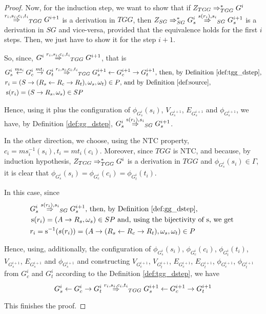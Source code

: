 \begin{proof}
	Now, for the induction step, we want to show that if $Z_{TGG} \Rightarrow^*_{TGG} G^i$ $\tderiv{r_{i}}{s_{i},c_{i},t_{i}}{TGG} G^{i+1}$ is a derivation in $TGG$, then $\startG{SG} \derivtr{SG} G^i_s \deriv{s(r_{i})}{s_{i}}{SG} G^{i+1}_s$ is a derivation in $SG$ and vice-versa, provided that the equivalence holds for the first $i$ steps. Then, we just have to show it for the step $i+1$.
	
	So, since, $G^i \tderiv{r_{i}}{s_{i},c_{i},t_{i}}{TGG} G^{i+1}$, that is
	\begin{align*}
		& G^i_s \ms{ms_i} G^i_c \mt{mt_i} G^i_t \tderiv{r_i}{s_i,c_i,t_i}{TGG} G^{i+1}_s \ms{} G^{i+1}_c \mt{} G^{i+1}_t \text{, then, by Definition \ref{def:tgg_dstep},}\\
		& r_i = (S \pro (R_s \ms{} R_c \mt{} R_t), \omega_s, \omega_t) \in P \text{, and by Definition \ref{def:source},}\\
		& \source(r_i) = (S \pro R_s, \omega_s) \in SP
	\end{align*}
	
	Hence, using it plus the configuration of $\phi_{G^i_s}(s_i)$, $V_{G^{i+1}_s}$, $E_{G^{i+1}_s}$ and $\phi_{G^{i+1}_s}$, we have, by Definition \ref{def:gg_dstep}, $G_s^i \deriv{\source(r_i)}{s_i}{SG} G^{i+1}_s$.
	
	In the other direction, we choose, using the NTC property, $c_i = ms_i^{-1}(s_i), t_i = mt_i(c_i)$. Moreover, since $TGG$ is NTC, and because, by induction hypothesis, $Z_{TGG} \Rightarrow^*_{TGG} G^i$ is a derivation in $TGG$ and $\phi_{G^i_s}(s_i) \in \Gamma$, it is clear that $\phi_{G^i_s}(s_i) = \phi_{G^i_c}(c_i) = \phi_{G^i_t}(t_i)$.
	
	In this case, since
	\begin{align*}
		& G^{i}_s \deriv{s(r_i)}{s_i}{SG} G^{i+1}_s \text{, then, by Definition \ref{def:gg_dstep},}\\
		& \source(r_i) = (A \pro R_s, \omega_s) \in SP \text{ and, using the bijectivity of $\source$, we get }\\
		& r_i = \source^{-1}(s(r_i)) = (A \pro (R_s \ms{} R_c \mt{} R_t), \omega_s, \omega_t) \in P
	\end{align*} 
	
	Hence, using, additionally, the configuration of $\phi_{G^i_s}(s_i)$, $\phi_{G^i_c}(c_i)$, $\phi_{G^i_t}(t_i)$, $V_{G^{i+1}_s}$, $E_{G^{i+1}_s}$ and $\phi_{G^{i+1}_s}$ and constructing $V_{G^{i+1}_c}$, $V_{G^{i+1}_t}$, $E_{G^{i+1}_c}$, $E_{G^{i+1}_t}$, $\phi_{G^{i+1}_c}$, $\phi_{G^{i+1}_t}$ from $G^i_c$ and $G^i_t$ according to the Definition \ref{def:tgg_dstep}, we have 
	\begin{equation*}
		G^i_s \ms{} G^i_c \mt{} G^i_t \tderiv{r_i}{s_i,c_i,t_i}{TGG} G^{i+1}_s \ms{} G^{i+1}_c \mt{} G^{i+1}_t
	\end{equation*}
	
	This finishes the proof.
\end{proof}


